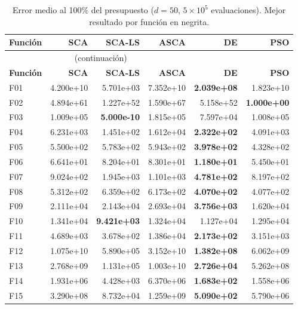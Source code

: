 \documentclass[12pt,a4paper]{article}
\begin{document}
\begin{longtable}{lrrrrr}
\caption{Error medio al 100\% del presupuesto ($d=50$, $5\times10^5$ evaluaciones). Mejor resultado por función en negrita.}
\label{tab:resultados_sca_ls_d50}\\
\toprule
\textbf{Función} & \textbf{SCA} & \textbf{SCA-LS} & \textbf{ASCA} & \textbf{DE} & \textbf{PSO} \\
\midrule
\endfirsthead
\multicolumn{4}{c}{\tablename~\thetable{} (continuación)}\\
\toprule
\textbf{Función} & \textbf{SCA} & \textbf{SCA-LS} & \textbf{ASCA} & \textbf{DE} & \textbf{PSO} \\
\midrule
\endhead
\midrule
\endfoot
\bottomrule
\endlastfoot
F01  & 4.200e+10 & 5.701e+03 & 7.352e+10 & \textbf{2.039e+08} & 1.823e+10 \\
F02  & 4.894e+61 & 1.227e+52 & 1.590e+67 & 5.158e+52 & \textbf{1.000e+00} \\
F03  & 1.009e+05 & \textbf{5.000e-10} & 1.815e+05 & 7.597e+04 & 1.008e+05 \\
F04  & 6.231e+03 & 1.451e+02 & 1.612e+04 & \textbf{2.322e+02} & 4.091e+03 \\
F05  & 5.500e+02 & 5.783e+02 & 5.943e+02 & \textbf{3.978e+02} & 4.328e+02 \\
F06  & 6.641e+01 & 8.204e+01 & 8.301e+01 & \textbf{1.180e+01} & 5.450e+01 \\
F07  & 9.024e+02 & 1.945e+03 & 1.101e+03 & \textbf{4.781e+02} & 8.197e+02 \\
F08  & 5.312e+02 & 6.359e+02 & 6.173e+02 & \textbf{4.070e+02} & 4.077e+02 \\
F09  & 2.111e+04 & 2.143e+04 & 2.693e+04 & \textbf{3.756e+03} & 1.620e+04 \\
F10  & 1.341e+04 & \textbf{9.421e+03} & 1.324e+04 & 1.127e+04 & 1.295e+04 \\
F11  & 4.689e+03 & 3.678e+02 & 1.386e+04 & \textbf{2.173e+02} & 3.151e+03 \\
F12  & 1.075e+10 & 5.890e+05 & 3.152e+10 & \textbf{1.382e+08} & 6.062e+09 \\
F13  & 2.768e+09 & 1.131e+05 & 1.003e+10 & \textbf{2.726e+04} & 5.262e+08 \\
F14  & 1.931e+06 & 4.428e+03 & 6.370e+06 & \textbf{1.683e+02} & 1.558e+06 \\
F15  & 3.290e+08 & 8.732e+04 & 1.259e+09 & \textbf{5.090e+02} & 5.790e+06 \\

\end{longtable}
\end{document}
